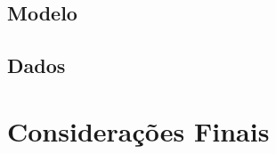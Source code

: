 \documentclass[12pt,oneside,a4paper,chapter=TITLE,english,brazil,sumario=abnt-6027-2012]{abntex2}
\begin{document}
\section{Modelo}

\section{Dados}

\chapter{Considerações Finais}










\end{document}
